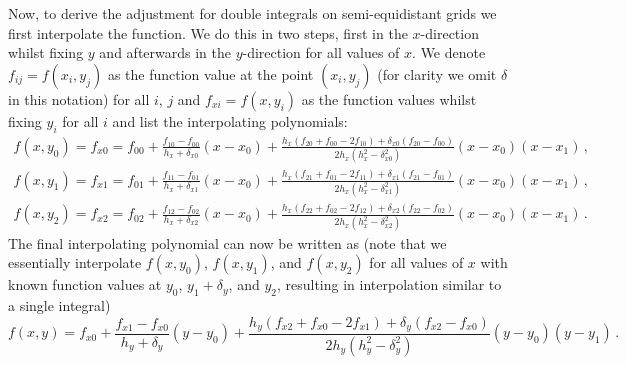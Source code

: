 Now, to derive the adjustment for double integrals on semi-equidistant grids we first interpolate the function.
We do this in two steps, first in the $x$-direction whilst fixing $y$ and afterwards in the $y$-direction for all values of $x$.
We denote $f_{ij} = f(x_i, y_j)$ as the function value at the point $(x_i, y_j)$ (for clarity we omit $\delta$ in this notation) for all $i$, $j$ and $f_{xi} = f(x, y_i)$ as the function values whilst fixing $y_i$ for all $i$ and list the interpolating polynomials:
\begin{gather}
    f(x, y_0) = f_{x0} = f_{00} + \frac{f_{10}-f_{00}}{h_{x}+\delta_{x0}} (x-x_0) + \frac{h_{x}(f_{20}+f_{00}-2f_{10})+\delta_{x0}(f_{20}-f_{00})}{2h_{x}(h_{x}^2-\delta_{x0}^2)} (x-x_0)(x-x_1) \,,\nonumber \\
    f(x, y_1) = f_{x1} = f_{01} + \frac{f_{11}-f_{01}}{h_{x}+\delta_{x1}} (x-x_0) + \frac{h_{x}(f_{21}+f_{01}-2f_{11})+\delta_{x1}(f_{21}-f_{01})}{2h_{x}(h_{x}^2-\delta_{x1}^2)} (x-x_0)(x-x_1) \,,\nonumber \\
    f(x, y_2) = f_{x2} = f_{02} + \frac{f_{12}-f_{02}}{h_{x}+\delta_{x2}} (x-x_0) + \frac{h_{x}(f_{22}+f_{02}-2f_{12})+\delta_{x2}(f_{22}-f_{02})}{2h_{x}(h_{x}^2-\delta_{x2}^2)} (x-x_0)(x-x_1) \,.\nonumber
\end{gather}
The final interpolating polynomial can now be written as (note that we essentially interpolate $f(x, y_0)$, $f(x, y_1)$, and $f(x, y_2)$ for all values of $x$ with known function values at $y_0$, $y_1+\delta_y$, and $y_2$, resulting in interpolation similar to a single integral)
\begin{equation}
    f(x, y) = f_{x0} + \frac{f_{x1}-f_{x0}}{h_y+\delta_y} (y-y_0) + \frac{h_y(f_{x2}+f_{x0}-2f_{x1})+\delta_y(f_{x2}-f_{x0})}{2h_y(h_y^2-\delta_y^2)} (y-y_0)(y-y_1) \,.\nonumber
\end{equation}

